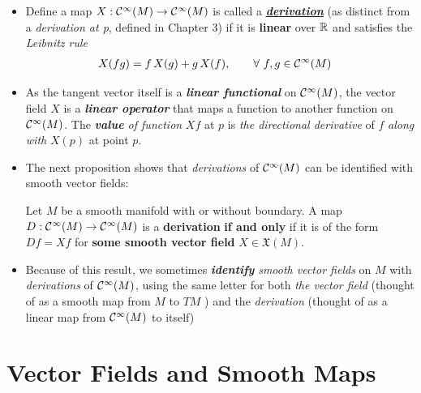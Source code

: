 \documentclass[11pt]{article}
\begin{document}
\begin{itemize}
\item \begin{definition}
Define a map $X: {\mathcal C}^{\infty}(M) \rightarrow {\mathcal C}^{\infty}(M)$ is called a \underline{\emph{\textbf{derivation}}} (as distinct from a \emph{derivation at p}, defined in Chapter 3) if it is \textbf{linear} over ${\mathbb R}$ and satisfies the \emph{Leibnitz rule}
\begin{align}
X(fg) &= f\, X(g) + g\, X(f),  \qquad \forall\,\, f,g \in {\mathcal C}^{\infty}(M) \label{eqn: derivation_vector_fields}
\end{align}
\end{definition}

\item \begin{remark}
As the tangent vector itself is a \emph{\textbf{linear functional}} on ${\mathcal C}^{\infty}(M)$, the vector field $X$ is a \emph{\textbf{linear operator}} that maps a function to another function on ${\mathcal C}^{\infty}(M)$. The \emph{\textbf{value} of function} $Xf$ at $p$ is \emph{the directional derivative} of $f$ \emph{along with} $X(p)$ at point $p$.
\end{remark}

\item The next proposition shows that \emph{derivations} of ${\mathcal C}^{\infty}(M)$ can be identified with smooth vector fields:
\begin{proposition}
Let $M$ be a smooth manifold with or without boundary. A map $D: {\mathcal C}^{\infty}(M) \rightarrow {\mathcal C}^{\infty}(M)$ is a \textbf{derivation} \textbf{if and only} if it is of the form $Df = Xf$ for \textbf{some smooth vector field} $X \in \mathfrak{X}(M)$.
\end{proposition}

\item \begin{remark}
Because of this result, we sometimes \emph{\textbf{identify}} \emph{smooth vector fields} on $M$ with \emph{derivations} of ${\mathcal C}^{\infty}(M)$, using the same letter for both \emph{the vector field} (thought of as a smooth map from $M$ to $TM$ ) and the \emph{derivation} (thought of as a linear map from ${\mathcal C}^{\infty}(M)$ to itself)
\end{remark}

\end{itemize}
\section{Vector Fields and Smooth Maps}
\end{document}
